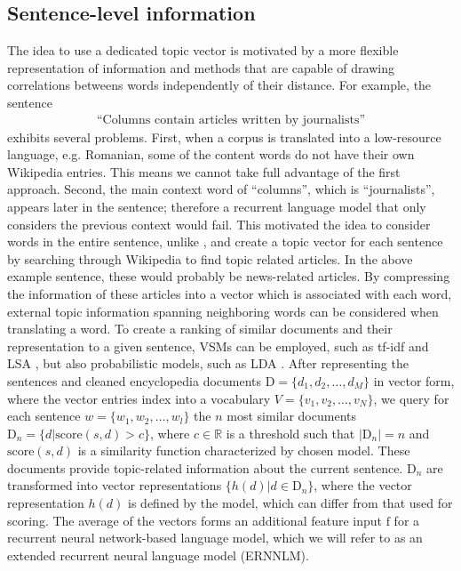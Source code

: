 \documentclass[a4paper]{article}
\begin{document}
\subsection{Sentence-level information} \label{sec:sentence-level}
The idea to use a dedicated topic vector is motivated by a more flexible representation of information and methods that are capable of drawing correlations betweens words independently of their distance.
For example, the sentence 
\begin{align*}
\text{``Columns contain articles written by journalists''}
\end{align*}
exhibits several problems. First, when a corpus is translated into a low-resource language, e.g. Romanian, some of the content words do not have their own Wikipedia entries. This means we cannot take full advantage of the first approach. Second, the main context word of ``columns'', which is ``journalists'', appears later in the sentence; therefore a recurrent language model that only considers the previous context would fail. 
This motivated the idea to consider words in the entire sentence, unlike \cite{mikolov2012context}, and create a topic vector for each sentence by searching through Wikipedia to find topic related articles. In the above example sentence, these would probably be news-related articles. By compressing the information of these articles into a vector which is associated with each word, external topic information spanning neighboring words can be considered when translating a word. 
To create a ranking of similar documents and their representation to a given sentence, VSMs can be employed, such as tf-idf \cite{salton1986introduction} and LSA \cite{bradford2008empirical}, but also probabilistic models, such as LDA \cite{blei2003latent}. After representing the sentences and cleaned encyclopedia documents $\text{D}=\{d_1, d_2, \ldots, d_M\}$ in vector form, where the vector entries index into a vocabulary $V=\{v_1, v_2, \ldots, v_N\}$, we query for each sentence $w= \{w_1, w_2, \ldots, w_l\}$ the $n$ most similar documents $\text{D}_n=\{d|\text{score}(s, d) > c\}$, where $c \in \mathbb{R}$ is a threshold such that $|\text{D}_n| = n$ and $\text{score}(s, d)$ is a similarity function characterized by chosen model. These documents provide topic-related information about the current sentence. $\text{D}_n$ are transformed into vector representations $\{h(d)| d \in \text{D}_n\}$, where the vector representation $h(d)$ is defined by the model, which can differ from that used for scoring. The average of the vectors forms an additional feature input $\text{f}$ for a recurrent neural network-based language model, which we will refer to as an extended recurrent neural language model (ERNNLM).
\end{document}
